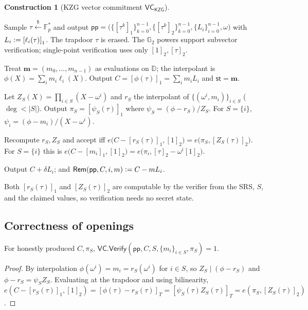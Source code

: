 \documentclass[version=submission]{iacrcc}
\theoremstyle{definition}
\newtheorem{construction}{Construction}[section]
\newcommand{\secpar}{\lambda}
\newcommand{\sample}{\xleftarrow{\;\$\;}}
\newcommand{\defeq}{\vcentcolon=}
\newcommand{\Setup}{\mathsf{Setup}}
\newcommand{\Commit}{\mathsf{Commit}}
\newcommand{\Open}{\mathsf{Open}}
\newcommand{\Vfy}{\mathsf{Verify}}
\newcommand{\Update}{\mathsf{Update}}
\newcommand{\Rem}{\mathsf{Rem}}
\newcommand{\pp}{\mathsf{pp}}
\newcommand{\aux}{\mathsf{st}}
\newcommand{\VC}{\mathsf{VC}}
\newcommand{\GG}{\mathbb{G}}
\newcommand{\FF}{\mathbb{F}}
\newcommand{\gone}[1]{\left[#1\right]_{1}}
\newcommand{\gtwo}[1]{\left[#1\right]_{2}}
\newcommand{\gtt}[1]{\left[#1\right]_{T}}
\newcommand{\dom}{\mathbb{D}}
\newcommand{\lag}{\ell}
\newcommand{\Zpol}{Z}
\newcommand{\rpol}{r}
\begin{document}
\begin{construction}[KZG vector commitment $\VC_{\mathsf{KZG}}$]\label{con:vc}
\leavevmode
\begin{description}[leftmargin=0em,itemsep=4pt]
\item[$\VC.\Setup(1^\secpar,1^{n})$.] Sample $\tau\sample\FF_p^{*}$ and output
      $\pp=\big(\{\gone{\tau^{k}}\}_{k=0}^{n-1},\{\gtwo{\tau^{k}}\}_{k=0}^{n-1},
      \{L_i\}_{i=0}^{n-1},\omega\big)$ with $L_i\defeq\gone{\lag_i(\tau)}$. The
      trapdoor $\tau$ is erased. The $\GG_2$ powers support subvector
      verification; single-point verification uses only $\gtwo{1},\gtwo{\tau}$.
\item[$\VC.\Commit(\pp,\mathbf{m})$.] Treat $\mathbf{m}=(m_0,\dots,m_{n-1})$ as
      evaluations on $\dom$; the interpolant is $\phi(X)=\sum_i m_i\lag_i(X)$.
      Output $C=\gone{\phi(\tau)}=\sum_{i}m_i L_i$ and $\aux=\mathbf{m}$.
\item[$\VC.\Open(\pp,\aux,S)$.] Let $\Zpol_S(X)=\prod_{i\in S}(X-\omega^{i})$ and
      $\rpol_S$ the interpolant of $\{(\omega^{i},m_i)\}_{i\in S}$ ($\deg<|S|$).
      Output $\pi_S=\gone{\psi_S(\tau)}$ where
      $\psi_S=(\phi-\rpol_S)/\Zpol_S$. For $S=\{i\}$,
      $\psi_i=(\phi-m_i)/(X-\omega^{i})$.
\item[$\VC.\Vfy(\pp,C,S,\{m_i\}_{i\in S},\pi_S)$.] Recompute $\rpol_S,\Zpol_S$ and
      accept iff
      $e\big(C-\gone{\rpol_S(\tau)},\gtwo{1}\big)=e\big(\pi_S,\gtwo{\Zpol_S(\tau)}\big)$.
      For $S=\{i\}$ this is
      $e\big(C-\gone{m_i},\gtwo{1}\big)=e\big(\pi_i,\gtwo{\tau}-\omega^{i}\gtwo{1}\big)$.
\item[$\VC.\Update(\pp,C,i,\delta)$.] Output $C+\delta L_i$; and
      $\Rem(\pp,C,i,m)\defeq C-m L_i$.
\end{description}
\end{construction}

Both $\gone{\rpol_S(\tau)}$ and $\gtwo{\Zpol_S(\tau)}$ are computable by the
verifier from the SRS, $S$, and the claimed values, so verification needs no
secret state.

\subsection{Correctness of openings}

\begin{lemma}\label{lem:open}
For honestly produced $C,\pi_S$, $\VC.\Vfy(\pp,C,S,\{m_i\}_{i\in S},\pi_S)=1$.
\end{lemma}
\begin{proof}
By interpolation $\phi(\omega^{i})=m_i=\rpol_S(\omega^{i})$ for $i\in S$, so
$\Zpol_S\mid(\phi-\rpol_S)$ and $\phi-\rpol_S=\psi_S\Zpol_S$. Evaluating at the
trapdoor and using bilinearity,
$e(C-\gone{\rpol_S(\tau)},\gtwo{1})=\gtt{\phi(\tau)-\rpol_S(\tau)}
 =\gtt{\psi_S(\tau)\Zpol_S(\tau)}=e(\pi_S,\gtwo{\Zpol_S(\tau)})$.
\end{proof}
\end{document}
